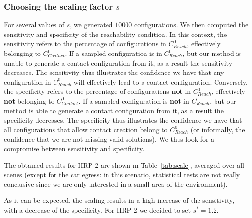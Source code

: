 \documentclass[journal]{IEEEtran}
\newcommand{\deladp}[1]{\deleted[id=adp]{#1}}
\newcommand{\gls}[1]{\textit{#1}}
\providecommand{\DIFaddtex}[1]{#1} %
\providecommand{\DIFdeltex}[1]{} %
\providecommand{\DIFaddbegin}{\protect\color{blue}} %
\providecommand{\DIFaddend}{\protect\color{black}} %
\providecommand{\DIFdelbegin}{\protect\cbdelete} %
\providecommand{\DIFdelend}{} %
\providecommand{\DIFadd}[1]{\texorpdfstring{\DIFaddtex{#1}}{#1}} %
\providecommand{\DIFdel}[1]{\texorpdfstring{\DIFdeltex{#1}}{}} %
\begin{document}
\subsubsection{Choosing the scaling factor $s$} \label{sec:params}
For several values of $s$, we generated $10 000$ configurations. 
We then computed the sensitivity \DIFaddbegin \DIFadd{and specificity }\DIFaddend of the reachability condition\DIFdelbegin \DIFdel{(}\DIFdelend \DIFaddbegin \DIFadd{.  In this context, the sensitivity refers to the }\DIFaddend percentage of configurations in $C_{Reach}^0$, effectively belonging to \gls{$C_{Contact}^0$}\DIFdelbegin \DIFdel{). Similarly we computed the specificity of the condition (}\DIFdelend \DIFaddbegin \DIFadd{. If a sampled configuration is in $C_{Reach}^0$, but our method is unable to generate a contact configuration from it, as a result the sensitivity
decreases. The sensitivity thus illustrates the confidence we have that any configuration in $C_{Reach}^0$ will effectively lead to a contact configuration.
Conversely, the specificity refers to the }\DIFaddend percentage of configurations \textbf{not} in $C_{Reach}^0$, effectively \textbf{not} belonging to \gls{$C_{Contact}^0$}\DIFdelbegin \DIFdel{).
}\DIFdelend \DIFaddbegin \DIFadd{.
If a sampled configuration is \textbf{not} in $C_{Reach}^0$, but our method is able to generate a contact configuration from it, as a result the specificity
decreases. The specificity thus illustrates the confidence we have that all configurations that allow contact creation belong to $C_{Reach}^0$ (or informally, the confidence that we are not missing valid solutions).
We thus look for a compromise between sensitivity and specificity.
}

\DIFaddend The obtained results for HRP-2 are shown in Table~\ref{tab:scale}, averaged over all scenes (except for the car egress: in this scenario, 
statistical tests are not really conclusive since we are only interested in a small area of the environment).

As it can be expected, the scaling results in a high increase of the sensitivity, with a decrease of the specificity.
For HRP-2 we decided to set $s^*=1.2$.
\end{document}
